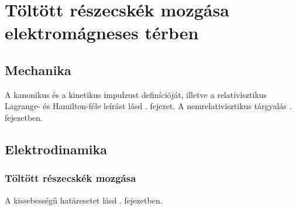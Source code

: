 \chapter{T\"olt\"ott r\'eszecsk\'ek mozg\'asa elektrom\'agneses t\'erben}
 
 \section{Mechanika} 
  
  A kanonikus és a kinetikus impulzust definícióját, illetve a relativisztikus Lagrange- és Hamilton-féle leírást lásd . fejezet.
   A nemrelativisztikus tárgyalás . fejezetben.
    
 \section{Elektrodinamika}
  
  \subsection{Töltött részecskék mozgása}
   
   A kissebességű határesetet lásd . fejezetben.
   
